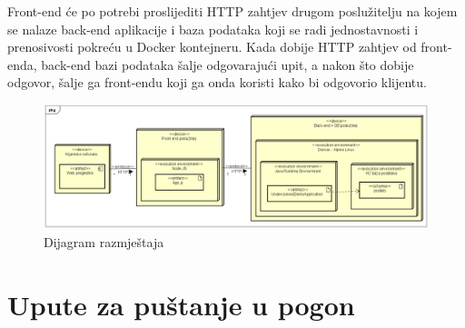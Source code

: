 			 Front-end će po potrebi proslijediti HTTP zahtjev drugom poslužitelju na kojem se nalaze back-end aplikacije i baza podataka koji se radi jednostavnosti i prenosivosti pokreću u Docker kontejneru. Kada dobije HTTP zahtjev od front-enda, back-end bazi podataka šalje odgovarajući upit, a nakon što dobije odgovor, šalje ga front-endu koji ga onda koristi kako bi odgovorio klijentu.
			\begin{figure}[H]
				\includegraphics[scale=0.35]{slike/dijagram_razmjestaja.png} %
				\centering
				\caption{Dijagram razmještaja}
				\label{fig:Dijagram razmještaja}
			\end{figure}
			\eject 
		
		\section{Upute za puštanje u pogon}
		
		
			
			

